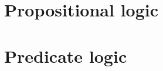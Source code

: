 \documentclass[11pt,a4paper]{report}
\begin{document}



\part{Propositional logic}






\part{Predicate logic}






% 
% 



\end{document}
